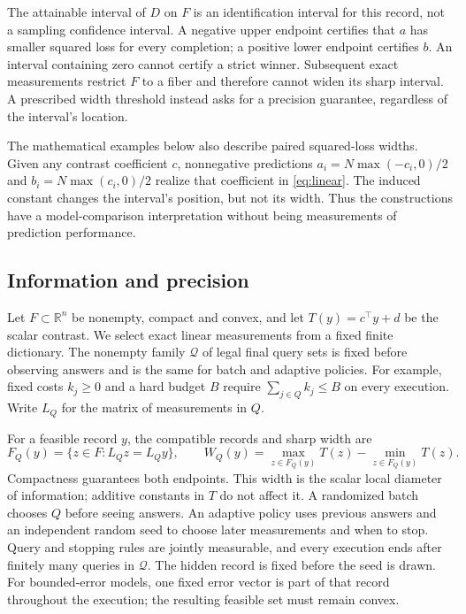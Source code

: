 \documentclass[12pt]{article}
\begin{document}
The attainable interval of $D$ on $F$ is an identification interval for
this record, not a sampling confidence interval. A negative upper endpoint
certifies that $a$ has smaller squared loss for every completion; a positive
lower endpoint certifies $b$. An interval containing zero cannot certify
a strict winner. Subsequent exact measurements restrict $F$ to a fiber and
therefore cannot widen its sharp interval. A prescribed width threshold
instead asks for a precision guarantee, regardless of the interval's location.

The mathematical examples below also describe paired squared-loss widths.
Given any contrast coefficient $c$, nonnegative predictions
$a_i=N\max(-c_i,0)/2$ and $b_i=N\max(c_i,0)/2$ realize that coefficient
in \eqref{eq:linear}. The induced constant changes the interval's position,
but not its width. Thus the constructions have a model-comparison
interpretation without being measurements of prediction performance.

\subsection{Information and precision}
\label{sec:risk_setup}
Let $F\subset\mathbb R^n$ be nonempty, compact and convex, and let
$T(y)=c^\top y+d$ be the scalar contrast. We select exact linear
measurements from a fixed finite dictionary. The nonempty family
$\mathcal Q$ of legal final query sets is fixed before observing answers
and is the same for batch and adaptive policies. For example, fixed costs
$k_j\geq0$ and a hard budget $B$ require $\sum_{j\in Q}k_j\leq B$ on
every execution. Write $L_Q$ for the matrix of measurements in $Q$.

For a feasible record $y$, the compatible records and sharp width are
\begin{equation}
 F_Q(y)=\{z\in F:L_Qz=L_Qy\},\qquad
 W_Q(y)=\max_{z\in F_Q(y)}T(z)-\min_{z\in F_Q(y)}T(z).
 \label{eq:risk_fiber}
\end{equation}
Compactness guarantees both endpoints. This width is the scalar local
diameter of information; additive constants in $T$ do not affect it.
A randomized batch chooses $Q$ before seeing answers. An adaptive policy
uses previous answers and an independent random seed to choose later
measurements and when to stop. Query and stopping rules are jointly
measurable, and every execution ends after finitely many queries in
$\mathcal Q$. The hidden record is fixed before the seed is drawn.
For bounded-error models, one fixed error vector is part of that record
throughout the execution; the resulting feasible set must remain convex.
\end{document}
